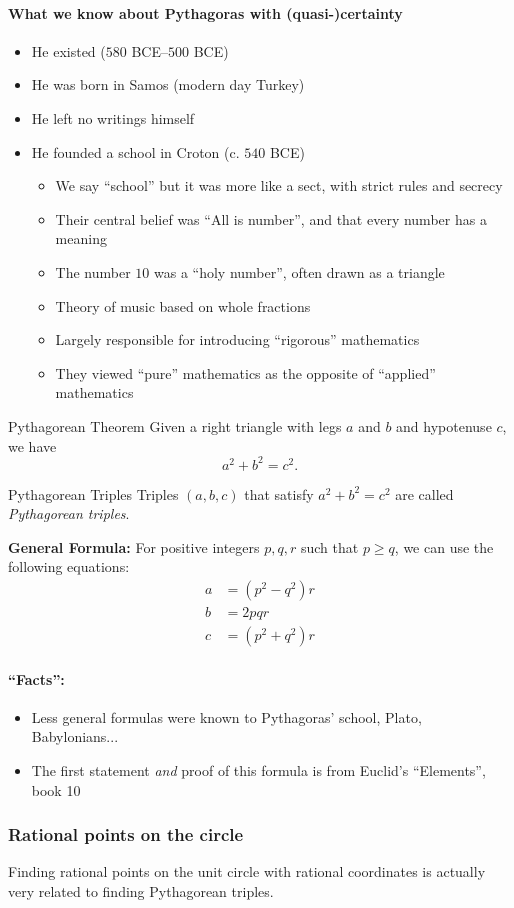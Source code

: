 \documentclass[class=article, crop=false]{standalone}
\begin{document}
  \paragraph{What we know about Pythagoras with (quasi-)certainty}
  \begin{itemize}
    \item He existed (\ttilde $580$ BCE--$500$ BCE)
    \item He was born in Samos (modern day Turkey)
    \item He left no writings himself
    \item He founded a school in Croton (c. $540$ BCE)
    \begin{itemize}
      \item We say ``school'' but it was more like a sect, with strict rules and secrecy
      \item Their central belief was ``All is number'', and that every number has a meaning
      \item The number $10$ was a ``holy number'', often drawn as a triangle
      \item Theory of music based on whole fractions
      \item Largely responsible for introducing ``rigorous'' mathematics
      \item They viewed ``pure'' mathematics as the opposite of ``applied'' mathematics
    \end{itemize}
  \end{itemize}
  \begin{theorem}{Pythagorean Theorem}
    Given a right triangle with legs $a$ and $b$ and hypotenuse $c$, we have
    \[
      a^2 + b^2 = c^2.
    \]
  \end{theorem}
  \begin{definition}{Pythagorean Triples}
    Triples $(a, b, c)$ that satisfy $a^2 + b^2 = c^2$ are called \emph{Pythagorean triples}.
  \end{definition}
  \textbf{General Formula:} For positive integers $p, q, r$ such that $p\geq q$, we can use the following equations:
  \begin{align*}
    a &= (p^2 - q^2)r \\
    b &= 2pqr \\
    c &= (p^2 + q^2)r
  \end{align*}
  \paragraph{``Facts'':}
  \begin{itemize}
    \item Less general formulas were known to Pythagoras' school, Plato, Babylonians...
    \item The first statement \emph{and} proof of this formula is from Euclid's ``Elements'', book 10
  \end{itemize}
  \subsubsection{Rational points on the circle}
  Finding rational points on the unit circle with rational coordinates is actually very related to finding Pythagorean triples.
\end{document}
